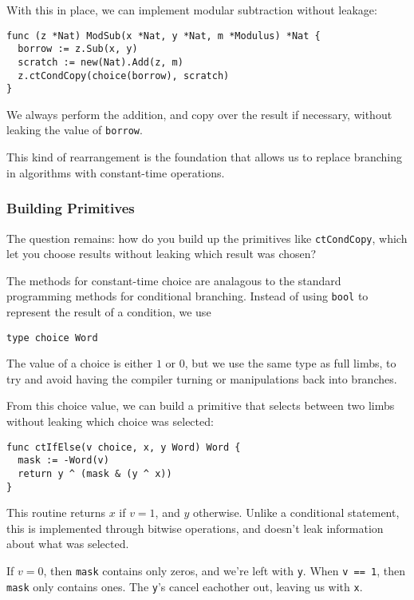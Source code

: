 \documentclass[11pt, a4paper]{article} %
\begin{document}
{With this in place, we can implement modular subtraction without leakage:

\begin{verbatim}
func (z *Nat) ModSub(x *Nat, y *Nat, m *Modulus) *Nat {
  borrow := z.Sub(x, y)
  scratch := new(Nat).Add(z, m)
  z.ctCondCopy(choice(borrow), scratch)
}
\end{verbatim}

We always perform the addition, and copy over the result if necessary,
without leaking the value of \texttt{borrow}.

This kind of rearrangement is the foundation that allows us to replace
branching in algorithms with constant-time operations.

\subsubsection{Building Primitives}

The question remains: how do you build up the primitives like
\texttt{ctCondCopy}, which let you choose results without
leaking which result was chosen?

The methods for constant-time choice are analagous to the standard
programming methods for conditional branching. Instead of using
\texttt{bool} to represent the result of a condition, we use

\begin{verbatim}
type choice Word
\end{verbatim}

The value of a choice is either $1$ or $0$, but we use the same
type as full limbs, to try and avoid having the compiler
turning or manipulations back into branches.

From this choice value, we can build a primitive that selects
between two limbs without leaking which choice was selected:

\begin{verbatim}
func ctIfElse(v choice, x, y Word) Word {
  mask := -Word(v)
  return y ^ (mask & (y ^ x))
} 
\end{verbatim}

This routine returns $x$ if $v = 1$, and $y$ otherwise. Unlike
a conditional statement, this is implemented through bitwise operations,
and doesn't leak information about what was selected.

If $v = 0$, then \texttt{mask} contains only zeros, and we're left
with \texttt{y}. When \texttt{v == 1},
then \texttt{mask} only contains ones. The \texttt{y}'s cancel eachother out,
leaving us with \texttt{x}.

}
\end{document}
